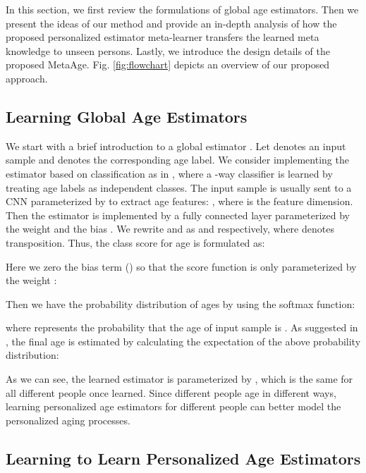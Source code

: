 \documentclass[journal,twoside]{IEEEtran}
\begin{document}
In this section, we first review the formulations of global age estimators. Then we present the ideas of our method and provide an in-depth analysis of how the proposed personalized estimator meta-learner transfers the learned meta knowledge to unseen persons. Lastly, we introduce the design details of the proposed MetaAge. Fig. \ref{fig:flowchart} depicts an overview of our proposed approach.



\subsection{Learning Global Age Estimators}
We start with a brief introduction to a global estimator . Let  denotes an input sample and  denotes the corresponding age label. We consider implementing  the estimator  based on classification as in \cite{rothe2018deep}, where a -way classifier is learned by treating age labels as independent classes. The input sample   is usually sent to a CNN  parameterized by   to extract age features: , where  is the feature dimension. Then the estimator  is implemented by a fully connected layer parameterized by the weight  and the bias . We rewrite  and   as  and   respectively, where  denotes transposition. Thus, the class score for age  is formulated as:


Here we zero the bias term () so that the score function is only parameterized by the weight :


Then we have the probability distribution of ages by  using the softmax function:

where  represents the probability that the age of input sample  is .
As suggested in \cite{rothe2018deep}, the final age  is  estimated by calculating the expectation of the above
 probability distribution:



As we can see, the learned estimator  is parameterized by , which is the same for all different people once learned. Since different people age in different ways, learning personalized age estimators for different people can better model the personalized aging processes.


\subsection{Learning to Learn Personalized Age Estimators}
\end{document}
